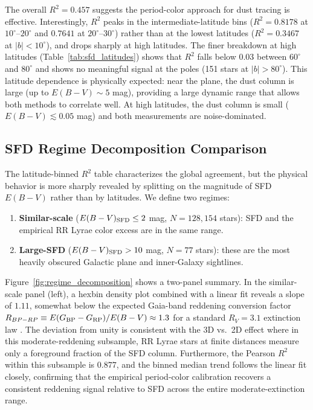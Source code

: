 \documentclass[10pt,preprint2]{aastex}
\begin{document}
The overall $R^2 = 0.457$ suggests the period-color approach for dust tracing is effective. Interestingly, $R^2$ peaks in the intermediate-latitude bins ($R^2 = 0.8178$ at $10^\circ$--$20^\circ$ and $0.7641$ at $20^\circ$--$30^\circ$) rather than at the lowest latitudes ($R^2 = 0.3467$ at $|b| < 10^\circ$), and drops sharply at high latitudes. The finer breakdown at high latitudes (Table~\ref{tab:sfd_latitudes}) shows that $R^2$ falls below 0.03 between $60^\circ$ and $80^\circ$ and shows no meaningful signal at the poles (151 stars at $|b| > 80^\circ$). This latitude dependence is physically expected: near the plane, the dust column is large (up to $E(B\!-\!V) \sim 5$ mag), providing a large dynamic range that allows both methods to correlate well. At high latitudes, the dust column is small ($E(B\!-\!V) \lesssim 0.05$ mag) and both measurements are noise-dominated.

\subsection{SFD Regime Decomposition Comparison}
\label{sec:regime}

The latitude-binned $R^2$ table characterizes the global agreement, but the physical behavior is more sharply revealed by splitting on the magnitude of SFD $E(B-V)$ rather than by latitudes. We define two regimes:

\begin{enumerate}
  \item \textbf{Similar-scale} ($E(B-V)_{\rm SFD} \leq 2$ mag, $N = 128{,}154$ stars): SFD and the empirical RR Lyrae color excess are in the same range.
  \item \textbf{Large-SFD} ($E(B-V)_{\rm SFD} > 10$ mag, $N = 77$ stars): these are the most heavily obscured Galactic plane and inner-Galaxy sightlines.
\end{enumerate}

Figure~\ref{fig:regime_decomposition} shows a two-panel summary. In the similar-scale panel (left), a hexbin density plot combined with a linear fit reveals a slope of $1.11$, somewhat below the expected Gaia-band reddening conversion factor $R_{BP-RP} \equiv E(G_{\rm BP}-G_{\rm RP})/E(B-V) \approx 1.3$ for a standard $R_V = 3.1$ extinction law \citep{Fitzpatrick1999, WangChen2019}. The deviation from unity is consistent with the 3D vs.\ 2D effect where in this moderate-reddening subsample, RR Lyrae stars at finite distances measure only a foreground fraction of the SFD column. Furthermore, the Pearson $R^2$ within this subsample is $0.877$, and the binned median trend follows the linear fit closely, confirming that the empirical period-color calibration recovers a consistent reddening signal relative to SFD across the entire moderate-extinction range.
\end{document}
